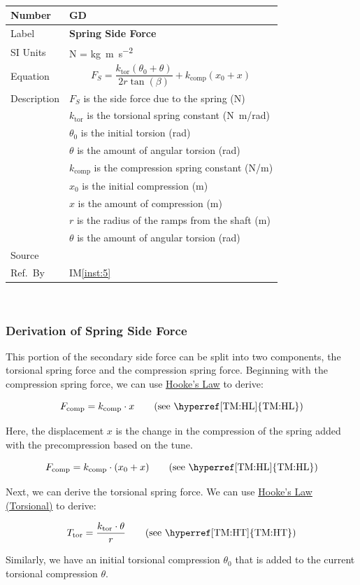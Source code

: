 \documentclass[12pt]{article}
\newcommand{\colAwidth}{0.13\textwidth}
\newcommand{\colBwidth}{0.82\textwidth}
\newcounter{defnum} %
\newcommand{\iref}[1]{IM\ref{#1}}
\newcommand{\defgeneral}[6] {
~\newline
\noindent
\begin{minipage}{\textwidth}
\renewcommand*{\arraystretch}{1.5}
\begin{tabular}{| p{\colAwidth} | p{\colBwidth}|}
  \hline
  \rowcolor[gray]{0.9}
  Number& GD\refstepcounter{defnum}\thedefnum \label{GD_\thedefnum}\\
  \hline
  Label& \bf #1 \\
  \hline
  SI Units& #2\\
  \hline
  Equation& #3\\
  \hline
  Description& #4 \\
  \hline
  Source& #5 \\
  \hline
  Ref.\ By & #6\\
  \hline
\end{tabular}
\end{minipage}\\
}
\begin{document}
\defgeneral
{Spring Side Force} %
{N = \si{\kilogram \metre\per\square\second}} %
{\[F_S = \frac{k_{\text{tor}}(\theta_0 + \theta)}{2r\tan(\beta)} + k_\text{comp}(x_0 + x)\]} %
{$F_S$ is the side force due to the spring (N) \\
& $k_{\text{tor}}$ is the torsional spring constant (\si[per-mode=symbol] {\newton\metre\per\radian}) \\
& $\theta_0$ is the initial torsion (rad) \\
& $\theta$ is the amount of angular torsion (rad) \\
& $k_{\text{comp}}$ is the compression spring constant (\si[per-mode=symbol] {\newton\per\metre}) \\
& $x_0$ is the initial compression (m) \\
& $x$ is the amount of compression (m) \\
& $r$ is the radius of the ramps from the shaft (m) \\
& $\theta$ is the amount of angular torsion (rad)} %
{} %
{\iref{inst:5}} %

\subsubsection*{Derivation of Spring Side Force}

This portion of the secondary side force can be split into two components, the torsional spring force and the compression spring force. 
Beginning with the compression spring force, we can use \hyperref[TM:HL]{Hooke's Law} to derive:

\[ F_{\text{comp}} = k_{\text{comp}} \cdot x \tag*{\text{(see \hyperref[TM:HL]{TM:HL})}}\]

Here, the displacement $x$ is the change in the compression of the spring added with the precompression based on the tune.

\[ F_{\text{comp}} = k_{\text{comp}} \cdot (x_0 + x) \tag*{\text{(see \hyperref[TM:HL]{TM:HL})}}\]

Next, we can derive the torsional spring force. We can use \hyperref[TM:HT]{Hooke's Law (Torsional)} to derive:

\[ T_{\text{tor}} = \frac{k_{\text{tor}} \cdot \theta}{r} \tag*{\text{(see \hyperref[TM:HT]{TM:HT})}}\]

Similarly, we have an initial torsional compression $\theta_0$ that is added to the current torsional compression $\theta$.
\end{document}
